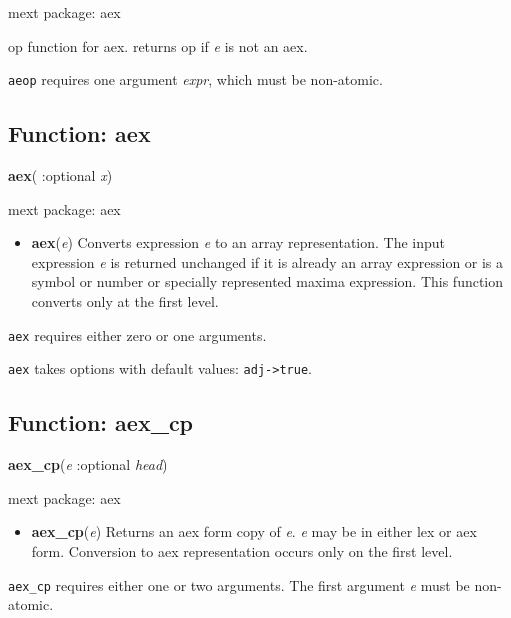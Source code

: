 \documentclass[]{article}
\begin{document}
\noindent mext package: aex



\vspace{5 pt}
op function for aex. returns op if {\it e} is not an aex. 

\vspace{5 pt}

   {\tt aeop} requires one argument {\it expr}, which must be non-atomic.


\vspace{5 pt}


\subsection{Function: aex\label{sec:aex}}
\hypertarget{aex}{}
{\bf aex}( :optional {\it x})


\noindent mext package: aex



\vspace{5 pt}
\begin{itemize}
\item[] {\bf aex}({\it e})
  Converts expression {\it e} to an array representation. The input expression {\it e} is returned unchanged if it is already an array expression or is a symbol or number or specially represented maxima expression. This function converts only at the first level. 

\end{itemize}
   {\tt aex} requires either zero or one arguments.


\vspace{5 pt}

{\tt aex} takes options with default values: {\tt adj->true}.
\vspace{5 pt}


\subsection{Function: aex\_cp\label{sec:aex_cp}}
\hypertarget{aex_cp}{}
{\bf aex\_cp}({\it e} :optional {\it head})


\noindent mext package: aex



\vspace{5 pt}
\begin{itemize}
\item[] {\bf aex\_cp}({\it e})
  Returns an aex form copy of {\it e}. {\it e} may be in either lex or aex form. Conversion to aex representation occurs only on the first level. 

\end{itemize}
   {\tt aex\_cp} requires either one or two arguments.
    The first argument {\it e} must be non-atomic.
\end{document}
